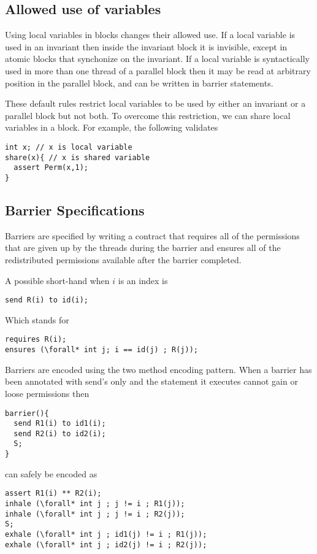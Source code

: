\subsection{Allowed use of variables}

Using local variables in blocks changes their allowed use.
If a local variable is used in an invariant then inside the invariant block it is invisible,
except in atomic blocks that synchonize on the invariant.
If a local variable is syntactically used in more than one thread of a
parallel block then it may be read at arbitrary position
in the parallel block, and can be written in barrier
statements.

These default rules restrict local variables to be used by either an invariant
or a parallel block but not both. To overcome this restriction, we can share local
variables in a block. For example, the following validates
\begin{lstlisting}
int x; // x is local variable
share(x){ // x is shared variable
  assert Perm(x,1);
}
\end{lstlisting}

\subsection{Barrier Specifications}

Barriers are specified by writing a contract that requires
all of the permissions that are given up by the threads
during the barrier and ensures all of the redistributed permissions
available after the barrier completed.

A possible short-hand when $i$ is an index is
\begin{lstlisting}
send R(i) to id(i);
\end{lstlisting}
Which stands for
\begin{lstlisting}
requires R(i);
ensures (\forall* int j; i == id(j) ; R(j));
\end{lstlisting}

Barriers are encoded using the two method encoding pattern.
When a barrier has been annotated with send's only
and the statement it executes cannot gain or loose permissions
then
\begin{lstlisting}
barrier(){
  send R1(i) to id1(i);
  send R2(i) to id2(i);
  S;
}
\end{lstlisting}
can safely be encoded as
\begin{lstlisting}
assert R1(i) ** R2(i);
inhale (\forall* int j ; j != i ; R1(j));
inhale (\forall* int j ; j != i ; R2(j));
S;
exhale (\forall* int j ; id1(j) != i ; R1(j));
exhale (\forall* int j ; id2(j) != i ; R2(j));
\end{lstlisting}

